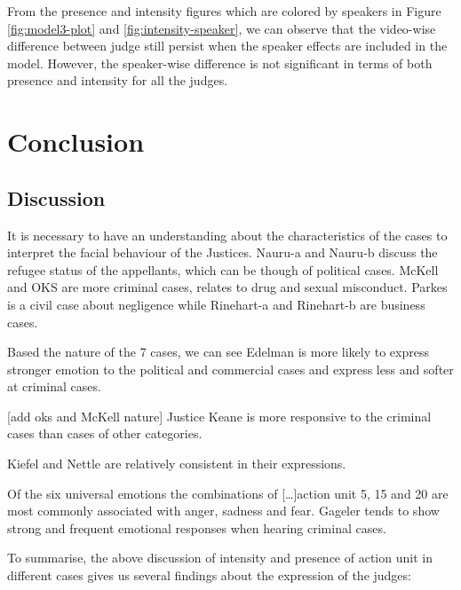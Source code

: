 \documentclass{monashthesis}
\begin{document}
From the presence and intensity figures which are colored by speakers in Figure \ref{fig:model3-plot} and \ref{fig:intensity-speaker}, we can observe that the video-wise difference between judge still persist when the speaker effects are included in the model. However, the speaker-wise difference is not significant in terms of both presence and intensity for all the judges.

\let\cleardoublepage\clearpage

\hypertarget{conclusion}{%
\chapter{Conclusion}\label{conclusion}}

\hypertarget{discussion}{%
\section{Discussion}\label{discussion}}

It is necessary to have an understanding about the characteristics of the cases to interpret the facial behaviour of the Justices. Nauru-a and Nauru-b discuss the refugee status of the appellants, which can be though of political cases. McKell and OKS are more criminal cases, relates to drug and sexual misconduct. Parkes is a civil case about negligence while Rinehart-a and Rinehart-b are business cases.

Based the nature of the 7 cases, we can see Edelman is more likely to express stronger emotion to the political and commercial cases and express less and softer at criminal cases.

{[}add oks and McKell nature{]} Justice Keane is more responsive to the criminal cases than cases of other categories.

Kiefel and Nettle are relatively consistent in their expressions.

Of the six universal emotions the combinations of {[}\ldots{}{]}action unit 5, 15 and 20 are most commonly associated with anger, sadness and fear. Gageler tends to show strong and frequent emotional responses when hearing criminal cases.

To summarise, the above discussion of intensity and presence of action unit in different cases gives us several findings about the expression of the judges:
\end{document}
